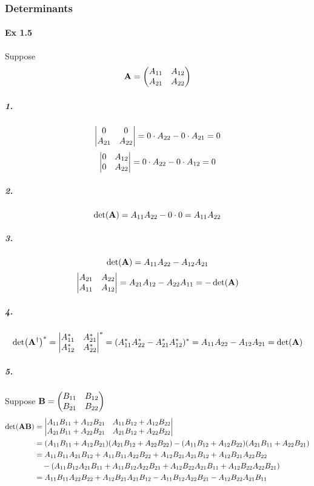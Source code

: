 \documentclass[a4paper]{article}
\newcommand{\ex}[1]{\paragraph{Ex #1}}
\newcommand{\subex}[1]{\subparagraph{#1}}
\numberwithin{equation}{subsection}
\begin{document}
\subsubsection{Determinants}
\ex{1.5}
Suppose 
\begin{equation}\label{key}
\vb{A} = \mqty(A_{11} & A_{12}\\A_{21} & A_{22})
\end{equation}
\subex{1.}
\begin{equation}\label{key}
\mqty|0 & 0\\A_{21} & A_{22}| = 0\cdot A_{22} - 0\cdot A_{21} = 0
\end{equation}
\begin{equation}\label{key}
\mqty|0 & A_{12}\\0 & A_{22}| = 0\cdot A_{22} - 0\cdot A_{12} = 0
\end{equation}
\subex{2.}
\begin{equation}\label{key}
\det(\vb{A}) = A_{11}A_{22} -  0\cdot 0 = A_{11}A_{22}
\end{equation}
\subex{3.}
\begin{equation}\label{key}
\det(\vb{A}) = A_{11}A_{22} -  A_{12}A_{21}
\end{equation}
\begin{equation}\label{key}
\mqty| A_{21} & A_{22}\\A_{11} & A_{12} | = A_{21}A_{12} - A_{22}A_{11} = -\det(\vb{A})
\end{equation}
\subex{4.}
\begin{equation}\label{key}
\det(\vb{A}^\dagger)^* = \mqty|A_{11}^* & A_{21}^*\\A_{12}^* & A_{22}^*|^* = (A_{11}^*A_{22}^* - A_{21}^*A_{12}^*)^* = A_{11}A_{22} -  A_{12}A_{21} = \det(\vb{A})
\end{equation}
\subex{5.}
Suppose $ \vb{B} = \mqty(B_{11} & B_{12}\\B_{21} & B_{22}) $
\begin{equation}\label{key}
\begin{aligned}
\det(\vb{A}\vb{B}) &= 
\mqty|A_{11}B_{11}+A_{12}B_{21} & A_{11}B_{12}+A_{12}B_{22}\\
A_{21}B_{11}+A_{22}B_{21} & A_{21}B_{12}+A_{22}B_{22}|\\
&= (A_{11}B_{11}+A_{12}B_{21})(A_{21}B_{12}+A_{22}B_{22}) - (A_{11}B_{12}+A_{12}B_{22})(A_{21}B_{11}+A_{22}B_{21})\\
&= A_{11}B_{11}A_{21}B_{12} + A_{11}B_{11}A_{22}B_{22} + A_{12}B_{21}A_{21}B_{12} + A_{12}B_{21}A_{22}B_{22}\\
&\quad - (A_{11}B_{12}A_{21}B_{11} +  A_{11}B_{12}A_{22}B_{21} + A_{12}B_{22}A_{21}B_{11} + A_{12}B_{22}A_{22}B_{21})\\
&= A_{11}B_{11}A_{22}B_{22} + A_{12}B_{21}A_{21}B_{12} - A_{11}B_{12}A_{22}B_{21} - A_{12}B_{22}A_{21}B_{11}
\end{aligned}
\end{equation}
\end{document}
